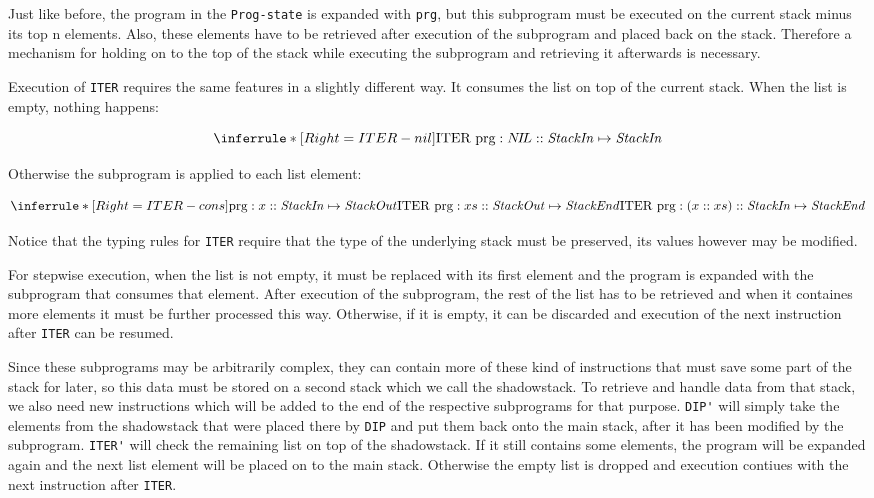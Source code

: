 Just like before, the program in the \verb/Prog-state/ is expanded with \verb/prg/,
but this subprogram must be executed on the current stack minus its top n elements.
Also, these elements have to be retrieved after execution of the subprogram and placed back on
the stack.
Therefore a mechanism for holding on to the top of the stack while executing the subprogram
and retrieving it afterwards is necessary.

Execution of \verb/ITER/ requires the same features in a slightly different way.
It consumes the list on top of the current stack.
When the list is empty, nothing happens:

% 
\[	\inferrule*	[Right=ITER-nil]
	{ }
	{\text{ITER prg} : N\!I\!L :: \text{\emph{StackIn}}  \mapsto \text{\emph{StackIn}} }
\]

Otherwise the subprogram is applied to each list element:

\[	\inferrule*	[Right=ITER-cons]
	{	\text{prg} :      x  :: \text{\emph{StackIn}}  \mapsto \text{\emph{StackOut}}
	\\\\	\text{ITER prg} : xs :: \text{\emph{StackOut}} \mapsto \text{\emph{StackEnd}} }
	{\text{ITER prg} : (x :: xs) :: \text{\emph{StackIn}}  \mapsto \text{\emph{StackEnd}} }
\]

Notice that the typing rules for \verb/ITER/ require that the type of the underlying stack must
be preserved, its values however may be modified.

For stepwise execution, when the list is not empty, it must be replaced with its first element
and the program is expanded with the subprogram that consumes that element.
After execution of the subprogram,
the rest of the list has to be retrieved
and when it containes more elements it must be further processed this way.
Otherwise, if it is empty, it can be discarded and execution of the next instruction
after \verb/ITER/ can be resumed.

Since these subprograms may be arbitrarily complex, they can contain more of these kind of
instructions that must save some part of the stack for later,
so this data must be stored on a second stack which we call the shadowstack.
To retrieve and handle data from that stack, we also need new instructions
which will be added to the end of the respective subprograms for that purpose.
\verb/DIP'/ will simply take the elements from the shadowstack that were placed there by \verb/DIP/
and put them back onto the main stack, after it has been modified by the subprogram.
\verb/ITER'/ will check the remaining list on top of the shadowstack.
If it still contains some elements, the program will be expanded again and the next list element
will be placed on to the main stack. Otherwise the empty list is dropped and execution contiues
with the next instruction after \verb/ITER/.

